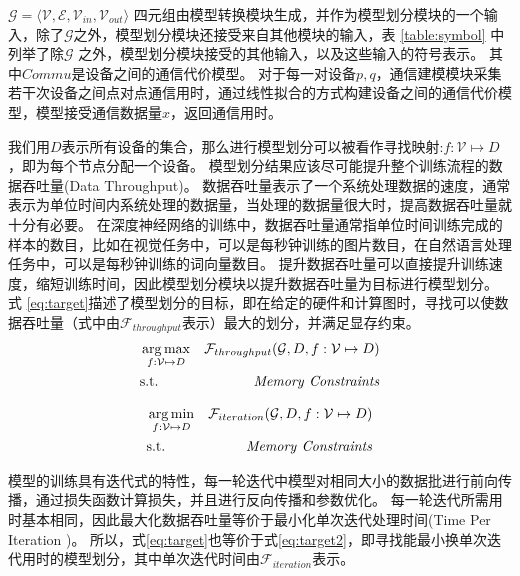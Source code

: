 

$\mathcal{G}=\langle \mathcal{V}, \mathcal{E}, \mathcal{V}_{\mathit{in}}, \mathcal{V}_{\mathit{out}} \rangle $ 四元组由模型转换模块生成，并作为模型划分模块的一个输入，除了$\mathcal{G}$之外，模型划分模块还接受来自其他模块的输入，表 \ref{table:symbol} 中列举了除$\mathcal{G}$ 之外，模型划分模块接受的其他输入，以及这些输入的符号表示。
其中$\mathit{Commu}$是设备之间的通信代价模型。
对于每一对设备$p, q$，通信建模模块采集若干次设备之间点对点通信用时，通过线性拟合的方式构建设备之间的通信代价模型，模型接受通信数据量$x$，返回通信用时。

我们用$D$表示所有设备的集合，那么进行模型划分可以被看作寻找映射:$f: \mathcal{V}\mapsto D$，即为每个节点分配一个设备。
模型划分结果应该尽可能提升整个训练流程的数据吞吐量(Data Throughput)。
数据吞吐量表示了一个系统处理数据的速度，通常表示为单位时间内系统处理的数据量，当处理的数据量很大时，提高数据吞吐量就十分有必要。
在深度神经网络的训练中，数据吞吐量通常指单位时间训练完成的样本的数目，比如在视觉任务中，可以是每秒钟训练的图片数目，在自然语言处理任务中，可以是每秒钟训练的词向量数目。
提升数据吞吐量可以直接提升训练速度，缩短训练时间，因此模型划分模块以提升数据吞吐量为目标进行模型划分。
式 \ref{eq:target}描述了模型划分的目标，即在给定的硬件和计算图时，寻找可以使数据吞吐量（式中由$\mathcal{F}_{throughput}$表示）最大的划分，并满足显存约束。
\begin{equation}
	\label{eq:target}
	\begin{aligned}
		& \operatorname*{arg\,max}_{f:\mathcal{V}\mapsto D} & \mathcal{F}_{throughput}(\mathcal{G}, D, f:\mathcal{V}\mapsto D) \\
		& \mathrm{s.t.} &\mathit{Memory}\ \mathit{Constraints}
	\end{aligned}
\end{equation}

\begin{equation}
	\label{eq:target2}
	\begin{aligned}
		& \operatorname*{arg\,min}_{f:\mathcal{V}\mapsto D} & \mathcal{F}_{iteration}(\mathcal{G}, D, f:\mathcal{V}\mapsto D) \\
		& \mathrm{s.t.} &\mathit{Memory}\ \mathit{Constraints}
	\end{aligned}
\end{equation}

模型的训练具有迭代式的特性，每一轮迭代中模型对相同大小的数据批进行前向传播，通过损失函数计算损失，并且进行反向传播和参数优化。
每一轮迭代所需用时基本相同，因此最大化数据吞吐量等价于最小化单次迭代处理时间(Time Per Iteration )。
所以，式\ref{eq:target}也等价于式\ref{eq:target2}，即寻找能最小换单次迭代用时的模型划分，其中单次迭代时间由$\mathcal{F}_{\mathit{iteration}}$表示。

